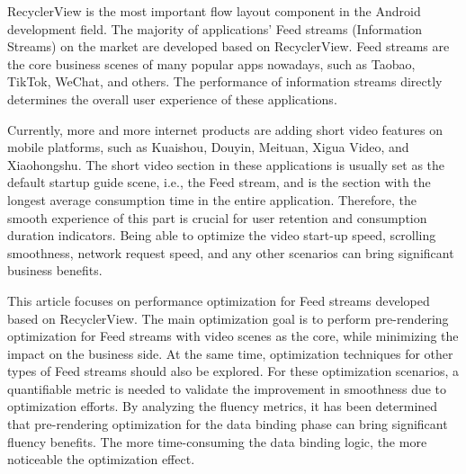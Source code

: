 RecyclerView is the most important flow layout component in the Android development field. The majority of applications' Feed streams (Information Streams) on the market are developed based on RecyclerView. Feed streams are the core business scenes of many popular apps nowadays, such as Taobao, TikTok, WeChat, and others. The performance of information streams directly determines the overall user experience of these applications.

Currently, more and more internet products are adding short video features on mobile platforms, such as Kuaishou, Douyin, Meituan, Xigua Video, and Xiaohongshu. The short video section in these applications is usually set as the default startup guide scene, i.e., the Feed stream, and is the section with the longest average consumption time in the entire application. Therefore, the smooth experience of this part is crucial for user retention and consumption duration indicators. Being able to optimize the video start-up speed, scrolling smoothness, network request speed, and any other scenarios can bring significant business benefits.

This article focuses on performance optimization for Feed streams developed based on RecyclerView. The main optimization goal is to perform pre-rendering optimization for Feed streams with video scenes as the core, while minimizing the impact on the business side. At the same time, optimization techniques for other types of Feed streams should also be explored. For these optimization scenarios, a quantifiable metric is needed to validate the improvement in smoothness due to optimization efforts. By analyzing the fluency metrics, it has been determined that pre-rendering optimization for the data binding phase can bring significant fluency benefits. The more time-consuming the data binding logic, the more noticeable the optimization effect.


